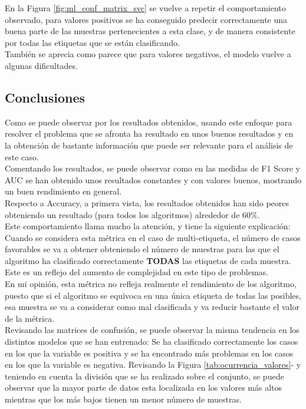 En la Figura \ref{fig:ml_conf_matrix_svc} se vuelve a repetir el comportamiento observado, para valores positivos se ha conseguido predecir correctamente una buena parte de las muestras pertenecientes a esta clase, y de manera consistente por todas las etiquetas que se están clasificando.\\
También se aprecia como parece que para valores negativos, el modelo vuelve a algunas dificultades.
\subsection{Conclusiones}
Como se puede observar por los resultados obtenidos, usando este enfoque para resolver el problema que se afronta ha resultado en unos buenos resultados y en la obtención de bastante información que puede ser relevante para el análisis de este caso.\\
\linebreak
Comentando los resultados, se puede observar como en las medidas de F1 Score y AUC se han obtenido unos resultados constantes y con valores buenos, mostrando un buen rendimiento en general.\\
Respecto a Accuracy, a primera vista, los resultados obtenidos han sido peores obteniendo un resultado (para todos los algoritmos) alrededor de 60\%.\\
Este comportamiento llama mucho la atención, y tiene la siguiente explicación: Cuando se considera esta métrica en el caso de multi-etiqueta, el número de casos favorables se va a obtener obteniendo el número de muestras para las que el algoritmo ha clasificado correctamente \textbf{TODAS} las etiquetas de cada muestra.\\ Este es un reflejo del aumento de complejidad en este tipo de problemas.\\
En mi opinión, esta métrica no refleja realmente el rendimiento de los algoritmo, puesto que si el algoritmo se equivoca en una única etiqueta de todas las posibles, esa muestra se va a considerar como mal clasificada y va reducir bastante el valor de la métrica.\\
\linebreak
Revisando las matrices de confusión, se puede observar la misma tendencia en los distintos modelos que se han entrenado: Se ha clasificado correctamente los casos en los que la variable es positiva y se ha encontrado más problemas en los casos en los que la variable es negativa. Revisando la Figura 	\ref{tab:ocurrencia_valores}- y teniendo en cuenta la división que se ha realizado sobre el conjunto, se puede observar que la mayor parte de datos esta localizada en los valores más altos mientras que los más bajos tienen un menor número de muestras.\\
